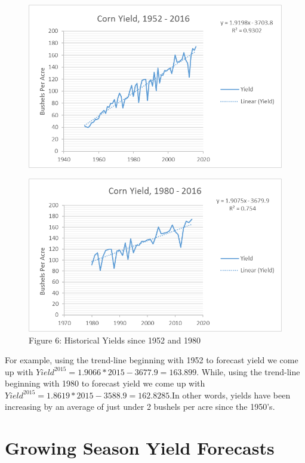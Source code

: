\documentclass[]{book}
\theoremstyle{definition}
\theoremstyle{definition}
\theoremstyle{remark}
\begin{document}
\begin{figure}[htbp]
\centering
\includegraphics{Excel-files/ForecastingProduction-HistoricalAcreage_files/image007.png}
\caption{}
\end{figure}

\begin{figure}[htbp]
\centering
\includegraphics{Excel-files/ForecastingProduction-HistoricalAcreage_files/image013.png}
\caption{Figure 6: Historical Yields since 1952 and 1980}
\end{figure}

For example, using the trend-line beginning with 1952 to forecast yield
we come up with \(Yield^{2015} = 1.9066*2015 - 3677.9 = 163.899\).
While, using the trend-line beginning with 1980 to forecast yield we
come up with \(Yield^{2015} = 1.8619*2015 - 3588.9 = 162.8285\).In other
words, yields have been increasing by an average of just under 2 bushels
per acre since the 1950's.

\section{Growing Season Yield
Forecasts}\label{growing-season-yield-forecasts}
\end{document}
